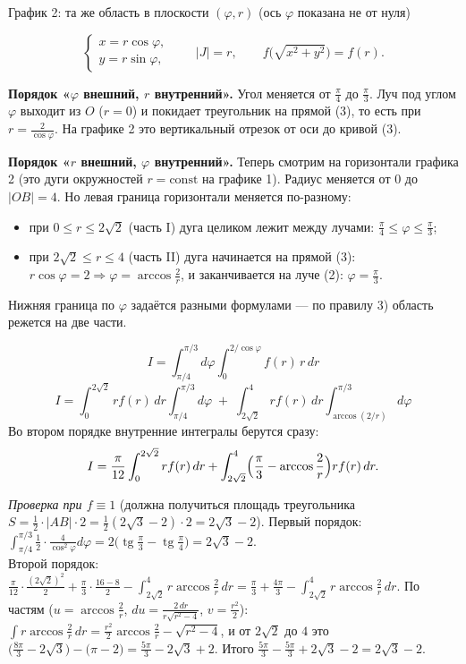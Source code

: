 \begin{center}
\begin{minipage}[t]{0.49\linewidth}
\small График 2: та же область в плоскости $(\varphi,r)$ (ось $\varphi$ показана не от нуля)
\end{minipage}
\end{center}

\[
\begin{cases}x=r\cos\varphi,\\ y=r\sin\varphi,\end{cases}\qquad |J|=r,\qquad f\bigl(\sqrt{x^2+y^2}\bigr)=f(r).
\]

\textbf{Порядок «$\varphi$ внешний, $r$ внутренний».} Угол меняется от $\frac\pi4$ до $\frac\pi3$. Луч под углом $\varphi$ выходит из $O$ ($r=0$) и покидает треугольник на прямой (3), то есть при $r=\frac{2}{\cos\varphi}$. На графике 2 это вертикальный отрезок от оси до кривой (3).

\textbf{Порядок «$r$ внешний, $\varphi$ внутренний».} Теперь смотрим на горизонтали графика 2 (это дуги окружностей $r=\mathrm{const}$ на графике 1). Радиус меняется от $0$ до $|OB|=4$. Но левая граница горизонтали меняется по-разному:
\begin{itemize}
\item при $0\leqslant r\leqslant2\sqrt2$ (часть I) дуга целиком лежит между лучами: $\frac\pi4\leqslant\varphi\leqslant\frac\pi3$;
\item при $2\sqrt2\leqslant r\leqslant4$ (часть II) дуга начинается на прямой (3): $r\cos\varphi=2\Rightarrow\varphi=\arccos\frac2r$, и заканчивается на луче (2): $\varphi=\frac\pi3$.
\end{itemize}
Нижняя граница по $\varphi$ задаётся разными формулами --- по правилу 3) область режется на две части.

\[
\boxed{\ I=\int_{\pi/4}^{\pi/3}d\varphi\int_0^{2/\cos\varphi}f(r)\,r\,dr\ }
\]
\[
\boxed{\ I=\int_0^{2\sqrt2}r f(r)\,dr\int_{\pi/4}^{\pi/3}d\varphi\;+\;\int_{2\sqrt2}^{4}r f(r)\,dr\int_{\arccos(2/r)}^{\pi/3}d\varphi\ }
\]
Во втором порядке внутренние интегралы берутся сразу:
\[
I=\frac{\pi}{12}\int_0^{2\sqrt2}rf(r)\,dr+\int_{2\sqrt2}^4\Bigl(\frac\pi3-\arccos\frac2r\Bigr)rf(r)\,dr .
\]

\emph{Проверка при $f\equiv1$} (должна получиться площадь треугольника $S=\frac12\cdot|AB|\cdot2=\frac12(2\sqrt3-2)\cdot2=2\sqrt3-2$).
Первый порядок: $\int_{\pi/4}^{\pi/3}\frac12\cdot\frac{4}{\cos^2\varphi}d\varphi=2\bigl(\operatorname{tg}\frac\pi3-\operatorname{tg}\frac\pi4\bigr)=2\sqrt3-2$. \checkmark\\
Второй порядок: $\frac{\pi}{12}\cdot\frac{(2\sqrt2)^2}{2}+\frac\pi3\cdot\frac{16-8}{2}-\int_{2\sqrt2}^4r\arccos\frac2r\,dr=\frac\pi3+\frac{4\pi}{3}-\int_{2\sqrt2}^4r\arccos\frac2r\,dr$. По частям ($u=\arccos\frac2r$, $du=\frac{2\,dr}{r\sqrt{r^2-4}}$, $v=\frac{r^2}{2}$):
$\int r\arccos\frac2r\,dr=\frac{r^2}{2}\arccos\frac2r-\sqrt{r^2-4}$, и от $2\sqrt2$ до $4$ это $\bigl(\frac{8\pi}{3}-2\sqrt3\bigr)-\bigl(\pi-2\bigr)=\frac{5\pi}{3}-2\sqrt3+2$. Итого $\frac{5\pi}{3}-\frac{5\pi}{3}+2\sqrt3-2=2\sqrt3-2$. \checkmark

